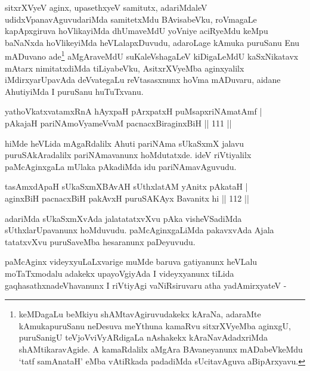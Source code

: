 \begin{artha}
sitxrXVyeV aginx, upasethxyeV samitutx, adariMdaleV
udidxVpanavAguvudariMda samitetxMdu BAvisabeVku, roVmagaLe
kapApxgiruva hoVlikayiMda dhUmaveMdU yoVniye aciRyeMdu keMpu baNaNxda
hoVlikeyiMda heVLalapxDuvudu, adaroLage kAmuka puruSanu Enu mADuvano
ade\footnote{keMDagaLu beMkiyu shAMtavAgiruvudakekx kAraNa, adaraMte
  kAmukapuruSanu neDesuva meYthuna kamaRvu sitxrXVyeMba aginxgU,
  puruSanigU teVjoVviVyARdigaLa nAshakekx kAraNavAdadxriMda
  shAMtikaravAgide. A kamaRdalilx aMgAra BAvaneyanunx mADabeVkeMdu
 `tatf samAnataH' eMba vAtiRkada padadiMda sUcitavAguva aBipArxyavu.} aMgAraveMdU suKaleVshagaLeV kiDigaLeMdU kaSxNikatavx
mAtarx nimitatxdiMda tiLiyabeVku, AsitxrXVyeMba aginxyalilx
iMdirxyarUpavAda deVvategaLu reVtasasxnunx hoVma mADuvaru, aidane
AhutiyiMda I puruSanu huTuTxvanu.
\end{artha}


\begin{shl}
yathoVkatxvatamxRnA hAyxpaH pArxpatxH puMsapxriNAmatAmf | \\
pAkajaH pariNAmoV\s yameVvaM pacnacxBiraginxBiH \hfill|| 111 || 
\end{shl}

\begin{artha}
hiMde heVLida mAgaRdalilx Ahuti pariNAma sUkaSxmX jalavu
puruSAkAradalilx pariNAmavanunx hoMdutatxde. ideV riVtiyalilx
paMcAginxgaLa mUlaka pAkadiMda idu pariNAmavAguvudu.
\end{artha}


\begin{shl}
tasAmxdApaH sUkaSxmXBAvAH sUthxlatAM yAnitx pAkataH | \\
aginxBiH pacnacxBiH pakAvxH puruSAKAyx Bavanitx hi \hfill|| 112 || 
\end{shl}

\begin{artha}
adariMda sUkaSxmXvAda jalatatatxvXvu pAka visheVSadiMda
sUthxlarUpavanunx hoMduvudu. paMcAginxgaLiMda pakavxvAda Ajala
tatatxvXvu puruSaveMba hesaranunx paDeyuvudu.
\end{artha}


\begin{artha}
paMcAginx videyxyuLaLxvarige muMde baruva gatiyanunx heVLalu  moTaTxmodalu adakekx upayoVgiyAda I videyxyanunx tiLida gaqhasathxnadeVhavanunx I riVtiyAgi vaNiRsiruvaru atha yadAmirxyateV -
\end{artha}

